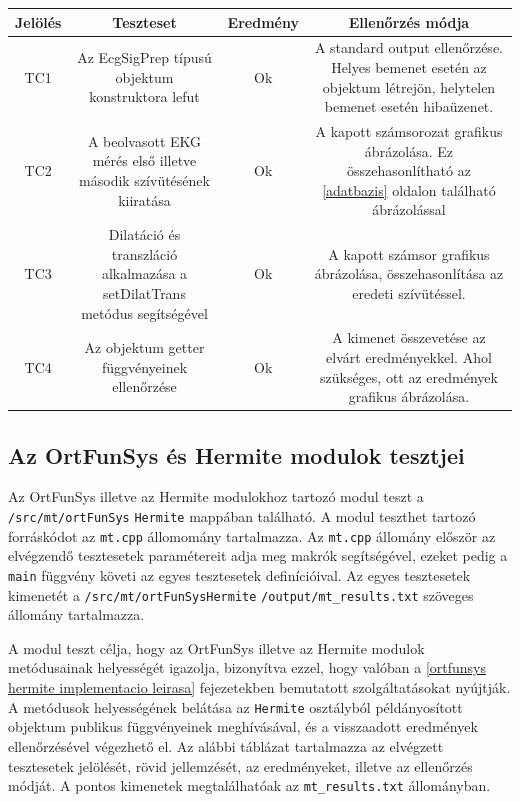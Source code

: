 \documentclass[oneside,titlepage,12pt,a4paper]{report}
\begin{document}
\begin{center}
\begin{adjustbox}{width=1\textwidth}
 \begin{tabular}{||c c c c||} 
 \hline
 Jelölés & Teszteset & Eredmény &  Ellenőrzés módja \\ [0.5ex] 
 \hline\hline
 TC1 & Az EcgSigPrep típusú objektum konstruktora lefut &  Ok & A standard output ellenőrzése. Helyes bemenet esetén az objektum létrejön, helytelen bemenet esetén hibaüzenet. \\ 
 \hline
 TC2 & A beolvasott EKG mérés első illetve második szívütésének kiiratása &  Ok & A kapott számsorozat grafikus ábrázolása. Ez összehasonlítható az \ref{adatbazis} oldalon található ábrázolással \\
 \hline
 TC3 & Dilatáció és transzláció alkalmazása a setDilatTrans metódus segítségével & Ok & A kapott számsor grafikus ábrázolása, összehasonlítása az eredeti szívütéssel. \\
 \hline
 TC4 & Az objektum getter függvényeinek ellenőrzése & Ok & A kimenet összevetése az elvárt eredményekkel. Ahol szükséges, ott az eredmények grafikus ábrázolása. \\
 \hline
\end{tabular}
\end{adjustbox}
\end{center}

\subsection{Az OrtFunSys és Hermite modulok tesztjei}

Az OrtFunSys illetve az Hermite modulokhoz tartozó modul teszt a \texttt{/src/mt/ortFunSys} \linebreak \texttt{Hermite} mappában található. A modul teszthet tartozó forráskódot az \texttt{mt.cpp} állomomány tartalmazza. Az \texttt{mt.cpp} állomány először az elvégzendő tesztesetek paramétereit adja meg makrók segítségével, ezeket pedig a \texttt{main} függvény követi az egyes \linebreak  tesztesetek definícióival. Az egyes tesztesetek kimenetét a \texttt{/src/mt/ortFunSysHermite} \linebreak  \texttt{/output/mt\_results.txt} szöveges állomány tartalmazza. 
\par A modul teszt célja, hogy az OrtFunSys illetve az Hermite modulok metódusainak helyességét igazolja, bizonyítva ezzel, hogy valóban a \ref{ortfunsys hermite implementacio leirasa} fejezetekben bemutatott szolgáltatásokat nyújtják. A metódusok helyességének belátása az \texttt{Hermite} osztályból példányosított objektum publikus függvényeinek meghívásával, és a visszaadott eredmények ellenőrzésével végezhető el. Az alábbi táblázat tartalmazza az elvégzett tesztesetek jelölését, rövid jellemzését, az eredményeket, illetve az ellenőrzés módját. A pontos kimenetek megtalálhatóak az \texttt{mt\_results.txt} állományban. 
\end{document}
